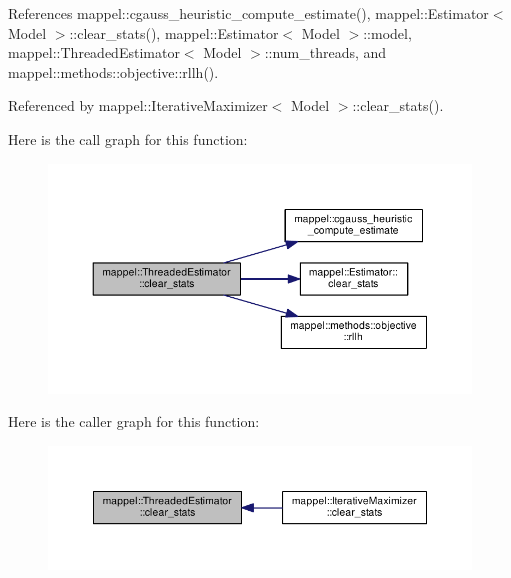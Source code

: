 References mappel\+::cgauss\+\_\+heuristic\+\_\+compute\+\_\+estimate(), mappel\+::\+Estimator$<$ Model $>$\+::clear\+\_\+stats(), mappel\+::\+Estimator$<$ Model $>$\+::model, mappel\+::\+Threaded\+Estimator$<$ Model $>$\+::num\+\_\+threads, and mappel\+::methods\+::objective\+::rllh().



Referenced by mappel\+::\+Iterative\+Maximizer$<$ Model $>$\+::clear\+\_\+stats().



Here is the call graph for this function\+:\nopagebreak
\begin{figure}[H]
\begin{center}
\leavevmode
\includegraphics[width=350pt]{classmappel_1_1ThreadedEstimator_a8acce3a5a89128403c97b53bc3698d61_cgraph}
\end{center}
\end{figure}




Here is the caller graph for this function\+:\nopagebreak
\begin{figure}[H]
\begin{center}
\leavevmode
\includegraphics[width=350pt]{classmappel_1_1ThreadedEstimator_a8acce3a5a89128403c97b53bc3698d61_icgraph}
\end{center}
\end{figure}


